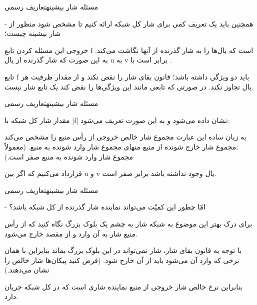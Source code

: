 \begin{itemframe}{مسئله شار بیشینه}{تعاریف رسمی}

\item[-]
همچنین باید یک تعریف کمی برای شار کل شبکه ارائه کنیم تا مشخص شود منظور از شار بیشینه چیست؛
\item
خروجی این مسئله کردن تابع f است که یال‌ها را به شار گذرنده از آنها نگاشت می‌کند. به این صورت که شار گذرنده از یال u به v برابر است با
 .

\item
تابع f باید دو ويژگی داشته باشد؛ قانون بقای شار را نقض نکند و از مقدار ظرفیت هر یال تجاوز نکند. در صورتی که تابعی مانند
این ویژگی‌ها را نقض کند یک تابع شار نیست.

\end{itemframe}

\begin{itemframe}{مسئله شار بیشینه}{تعاریف رسمی}
\item
مقدار شار کل شبکه با |f| نشان داده می‌شود و به این صورت تعریف می‌شود: \\
\begin{center}
\end{center}
\item
به زبان ساده این عبارت مجموع شار خالص خروجی از رأس منبع را مشخص می‌کند :مجموع شار خارج شونده از منبع منهای مجموع شار وارد شونده به منبع. (معمولاً مجموع شار وارد شونده به منبع صفر است.)
\item
قرارداد می‌کنیم که اگر بین u و v یال وجود نداشته باشد
برابر صفر است.
\end{itemframe}
\begin{itemframe}{مسئله شار بیشینه}{تعاریف رسمی}
\item[-]
امّا چطور این کمیّت می‌تواند نماینده شار گذرنده از کل شبکه باشد؟
\item
برای درک بهتر این موضوع به شبکه شار به چشم یک بلوک بزرگ نگاه کنید که از رأس منبع شار به آن وارد و از مقصد خارج می‌شود.

\item
با توجه به قانون بقای شار، شار نمی‌تواند در این بلوک بزرگ بماند بنابراین با همان نرخی که وارد آن می‌شود باید از آن خارج شود. (فرض کنید پیکان‌ها شار خالص را نشان می‌دهند.)‌
\item
بنابراین نرخ خالص شار خروجی از منبع نماینده شاری است که در کل شبکه جریان دارد.
\end{itemframe}


